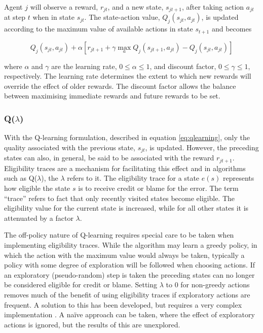 Agent $j$ will observe a reward, $r_{jt}$, and a new state, $s_{jt+1}$,
after taking action $a_{jt}$ at step $t$ when in state $s_{jt}$.  The
state-action value, $Q_j(s_{jt},a_{jt})$, is updated according to the
maximum value of available actions in state $s_{t+1}$ and becomes

\begin{equation}
\label{eq:qlearning}
Q_j(s_{jt},a_{jt}) + \alpha [r_{jt+1} + \gamma\max_{a} Q_j(s_{jt+1},a_{jt}) -
Q_j(s_{jt},a_{jt})]
\end{equation}

where $\alpha$ and $\gamma$ are the learning rate, $0\leq\alpha\leq1$, and
discount factor, $0\leq\gamma\leq1$, respectively.  The learning rate determines
the extent to which new rewards will override the effect of older rewards.
The discount factor allows the balance between maximising immediate rewards and
future rewards to be set.

\subsubsection{Q($\lambda$)}
\label{sec:qlambda}
With the Q-learning formulation, described in equation \ref{eq:qlearning}, only
the quality associated with the previous state, $s_{jt}$, is updated.  However,
the preceding states can also, in general, be said to be associated with the
reward $r_{jt+1}$.  Eligibility traces are a mechanism for facilitating this
effect and in algorithms such as Q($\lambda$), the $\lambda$ refers to it. The
eligibility trace for a state $e(s)$ represents how eligible the state $s$ is
to receive credit or blame for the error.  The term ``trace'' refers to fact
that only recently visited states become eligible.  The eligibility value for
the current state is increased, while for all other states it is attenuated by
a factor $\lambda$.

The off-policy nature of Q-learning requires special care to be taken when
implementing eligibility traces.  While the algorithm may learn a greedy
policy, in which the action with the maximum value would always be taken,
typically a policy with some degree of exploration will be followed when
choosing actions.  If an exploratory (pseudo-random) step is taken the
preceding states can no longer be considered eligible for credit or blame.
Setting $\lambda$ to $0$ for non-greedy actions removes much of the benefit of
using eligibility traces if exploratory actions are frequent.  A solution to
this has been developed, but requires a very complex implementation
\cite{peng:1996}.  A na\"ive approach can be taken, where the effect of
exploratory actions is ignored, but the results of this are unexplored.


